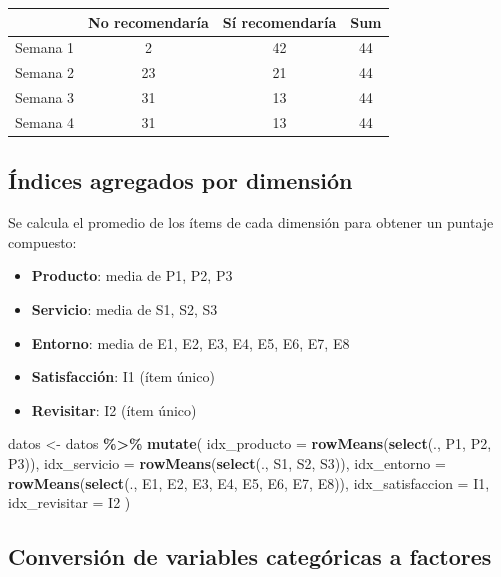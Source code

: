 \documentclass[
  spanish,
]{article}
\newenvironment{Shaded}{\begin{snugshade}}{\end{snugshade}}
\newcommand{\AttributeTok}[1]{\textcolor[rgb]{0.13,0.29,0.53}{#1}}
\newcommand{\FunctionTok}[1]{\textcolor[rgb]{0.13,0.29,0.53}{\textbf{#1}}}
\newcommand{\NormalTok}[1]{#1}
\newcommand{\OtherTok}[1]{\textcolor[rgb]{0.56,0.35,0.01}{#1}}
\newcommand{\SpecialCharTok}[1]{\textcolor[rgb]{0.81,0.36,0.00}{\textbf{#1}}}
\providecommand{\tightlist}{%
  \setlength{\itemsep}{0pt}\setlength{\parskip}{0pt}}
\begin{document}
\begin{longtable}[t]{lccc}
\toprule
 & No recomendaría & Sí recomendaría & Sum\\
\midrule
Semana 1 & 2 & 42 & 44\\
Semana 2 & 23 & 21 & 44\\
Semana 3 & 31 & 13 & 44\\
Semana 4 & 31 & 13 & 44\\
\bottomrule
\end{longtable}

\subsection{Índices agregados por
dimensión}\label{uxedndices-agregados-por-dimensiuxf3n}

Se calcula el promedio de los ítems de cada dimensión para obtener un
puntaje compuesto:

\begin{itemize}
\tightlist
\item
  \textbf{Producto}: media de P1, P2, P3
\item
  \textbf{Servicio}: media de S1, S2, S3
\item
  \textbf{Entorno}: media de E1, E2, E3, E4, E5, E6, E7, E8
\item
  \textbf{Satisfacción}: I1 (ítem único)
\item
  \textbf{Revisitar}: I2 (ítem único)
\end{itemize}

\begin{Shaded}
\begin{Highlighting}[]
\NormalTok{datos }\OtherTok{\textless{}{-}}\NormalTok{ datos }\SpecialCharTok{\%\textgreater{}\%}
  \FunctionTok{mutate}\NormalTok{(}
    \AttributeTok{idx\_producto     =} \FunctionTok{rowMeans}\NormalTok{(}\FunctionTok{select}\NormalTok{(., P1, P2, P3)),}
    \AttributeTok{idx\_servicio     =} \FunctionTok{rowMeans}\NormalTok{(}\FunctionTok{select}\NormalTok{(., S1, S2, S3)),}
    \AttributeTok{idx\_entorno      =} \FunctionTok{rowMeans}\NormalTok{(}\FunctionTok{select}\NormalTok{(., E1, E2, E3, E4, E5, E6, E7, E8)),}
    \AttributeTok{idx\_satisfaccion =}\NormalTok{ I1,}
    \AttributeTok{idx\_revisitar    =}\NormalTok{ I2}
\NormalTok{  )}
\end{Highlighting}
\end{Shaded}

\subsection{Conversión de variables categóricas a
factores}\label{conversiuxf3n-de-variables-categuxf3ricas-a-factores}
\end{document}
